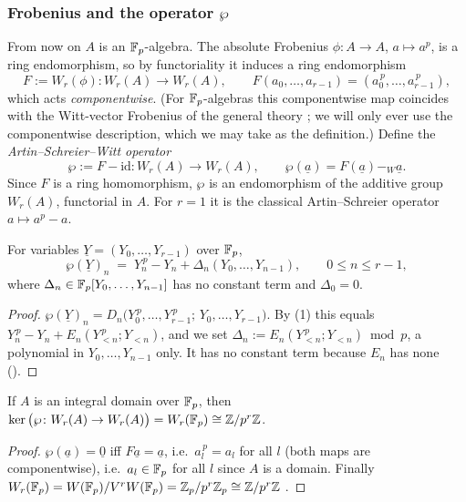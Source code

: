\documentclass[11pt]{article}
\newcommand{\wv}[1]{\underline{#1}}                 %
\begin{document}
\subsubsection*{Frobenius and the operator \texorpdfstring{$\wp$}{p}}

From now on $A$ is an $\mathbb{F}_p$-algebra.  The absolute Frobenius
$\phi\colon A\to A$, $a\mapsto a^p$, is a ring endomorphism, so by
functoriality it induces a ring endomorphism
\[
F:=W_r(\phi)\colon W_r(A)\to W_r(A),\qquad
F(a_0,\dots,a_{r-1})=(a_0^{\,p},\dots,a_{r-1}^{\,p}),
\]
which acts \emph{componentwise}.  (For $\mathbb{F}_p$-algebras this componentwise
map coincides with the Witt-vector Frobenius of the general theory
\cite[II \S6]{serreLF}; we will only ever use the componentwise
description, which we may take as the definition.)  Define the
\emph{Artin--Schreier--Witt operator}
\[
\wp:=F-\mathrm{id}\colon W_r(A)\longrightarrow W_r(A),
\qquad \wp(\wv a)=F(\wv a)-_W\wv a .
\]
Since $F$ is a ring homomorphism, $\wp$ is an endomorphism of the additive
group $W_r(A)$, functorial in $A$.  For $r=1$ it is the classical
Artin--Schreier operator $a\mapsto a^p-a$.

\begin{lemma}[shape of $\wp$]\label{lem:wp-triangular}
For variables $\wv Y=(Y_0,\dots,Y_{r-1})$ over $\mathbb{F}_p$,
\[
\wp(\wv Y)_n \;=\; Y_n^{\,p}-Y_n+\Delta_n(Y_0,\dots,Y_{n-1}),
\qquad 0\le n\le r-1,
\]
where $\Delta_n\in\mathbb{F}_p[Y_0,\dots,Y_{n-1}]$ has no constant term and
$\Delta_0=0$.
\end{lemma}

\begin{proof}
$\wp(\wv Y)_n=D_n\big(Y_0^{\,p},\dots,Y_{r-1}^{\,p};\,Y_0,\dots,Y_{r-1}\big)$.
By (1) this equals
$Y_n^{\,p}-Y_n+E_n(Y^{\,p}_{<n};Y_{<n})$, and we set
$\Delta_n:=E_n(Y^{\,p}_{<n};Y_{<n})\bmod p$, a polynomial in
$Y_0,\dots,Y_{n-1}$ only.  It has no constant term because $E_n$ has none
().
\end{proof}

\begin{lemma}[kernel of $\wp$]\label{lem:kernel}
If $A$ is an integral domain over $\mathbb{F}_p$, then
$\ker\big(\wp\colon W_r(A)\to W_r(A)\big)=W_r(\mathbb{F}_p)\cong\mathbb{Z}/p^r\mathbb{Z}$.
\end{lemma}

\begin{proof}
$\wp(\wv a)=\wv 0$ iff $F\wv a=\wv a$, i.e.\ $a_l^{\,p}=a_l$ for all $l$
(both maps are componentwise), i.e.\ $a_l\in\mathbb{F}_p$ for all $l$ since $A$ is a
domain.  Finally $W_r(\mathbb{F}_p)=W(\mathbb{F}_p)/V^rW(\mathbb{F}_p)=\mathbb{Z}_p/p^r\mathbb{Z}_p\cong\mathbb{Z}/p^r\mathbb{Z}$
\cite[II \S6]{serreLF}.
\end{proof}
\end{document}
